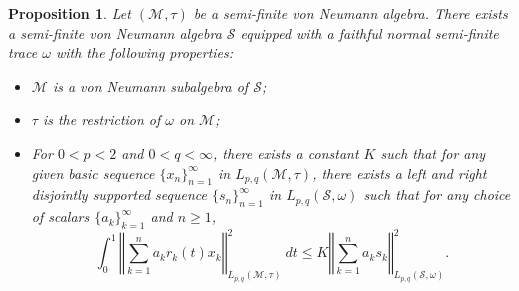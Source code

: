 \documentclass[12pt]{amsart}
\let\cal\mathcal
\newtheorem{proposition}[theorem]{Proposition}
\def\m{{\cal M}}
\numberwithin{equation}{section}
\numberwithin{theorem}{section}
\begin{document}
\begin{proposition}\label{disjointification}
Let $(\m,\tau)$ be a semi-finite von Neumann algebra. There exists a 
semi-finite von Neumann algebra $\cal S$ equipped with a faithful
normal semi-finite trace $\omega$ with the following properties:
\begin{itemize}
\item[(i)] $\m $ is a von Neumann subalgebra of $\cal S$;
\item[(ii)] $\tau$ is the restriction of $\omega$ on $\m$;
\item[(iii)] For $0<p< 2$ and $0<q<\infty$, there exists a
constant $K$ such that for any given basic sequence
$\{x_n\}_{n=1}^\infty$ in $L_{p,q}(\m,\tau)$, there exists a left
and right
disjointly supported  sequence $\{s_n\}_{n=1}^\infty$ in $L_{p,q}(\cal S, \omega)$
such that for any choice of scalars $\{a_k\}_{k=1}^\infty$ and
$n \geq 1$,
$$ 
\int_{0}^1 \left\Vert \sum_{k=1}^n a_k r_k(t)x_k 
\right\Vert_{L_{p,q}(\m,\tau)}^2\ dt \leq
K\left\Vert \sum_{k=1}^n a_ks_k 
\right\Vert_{L_{p,q}(\cal S,\omega)}^2.
$$
\end{itemize}
\end{proposition} 
\end{document}
